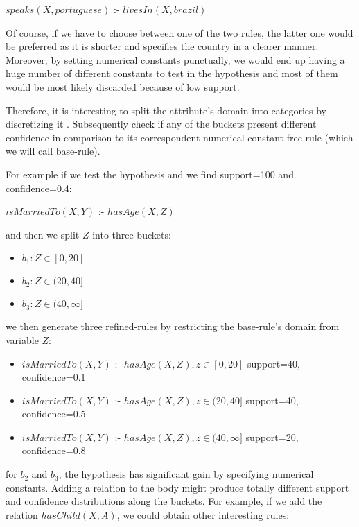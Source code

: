 \begin{center}
 $speaks(X,portuguese)$ :- $livesIn(X,brazil)$
\end{center}

Of course, if we have to choose between one of the two rules, the latter one would be preferred as it is shorter and
specifies the country in a clearer manner. Moreover, by setting numerical constants punctually, we would end up having a
huge number of different constants to test in the hypothesis and most of them would be most likely discarded because of
low support.

Therefore, it is interesting to split the attribute's domain into categories by discretizing it .
Subsequently check if any of the buckets present different confidence in comparison to its correspondent numerical
constant-free rule (which we will call base-rule).

For example if we test the hypothesis and we find support=100 and confidence=0.4:

\begin{center}
 $isMarriedTo(X,Y)$ :- $hasAge(X,Z)$ 
\end{center}

and then we split $Z$ into three buckets:

\begin{itemize}
 \item $ b_1: Z\in[0,20]$
 \item $ b_2: Z\in(20,40]$
 \item $ b_3: Z\in(40,\infty]$
\end{itemize}

we then generate three refined-rules by restricting the base-rule's domain from variable $Z$:

\begin{itemize}

 \item $isMarriedTo(X,Y)$ :- $hasAge(X,Z), z\in[0,20]$	
    \newline support=40, confidence=0.1
 \item $isMarriedTo(X,Y)$ :- $hasAge(X,Z), z\in(20,40]$	
    \newline support=40, confidence=0.5
 \item $isMarriedTo(X,Y)$ :- $hasAge(X,Z), z\in(40,\infty]$
    \newline support=20, confidence=0.8

\end{itemize}

for $b_2$ and $b_3$, the hypothesis has significant gain by specifying numerical constants. Adding a relation to the
body might produce totally different support and confidence distributions along the buckets. For example, if we add the
relation $hasChild(X,A)$, we could obtain other interesting rules:


